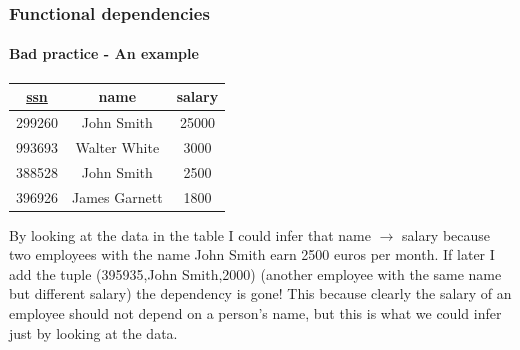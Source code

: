 \documentclass{beamer}
\newcommand{\fdep}[2]{#1 $\rightarrow$ #2}
\begin{document}
\begin{frame}
	\frametitle{Functional dependencies}
	\framesubtitle{Bad practice - An example}
	
	\begin{table}
		\begin{tabular}{|c|c|c|}
			\hline
			\underline{ssn} & name & salary\\
			\hline
			299260 & John Smith & 25000 \\
			\hline
			993693 & Walter White & 3000 \\
			\hline
			388528 & John Smith & 2500\\
			\hline
			396926 & James Garnett & 1800 \\
			\hline
		\end{tabular}
	\end{table}
	
	By looking at the data in the table I could infer that \fdep{name}{salary} because two employees with the name John Smith earn 2500 euros per month.
	If later I add the tuple (395935,John Smith,2000) (another employee with the same name but different salary) the dependency is gone!
	This because clearly the salary of an employee should not depend on a person’s name, but this is what we could infer just by looking at the data.
	
\end{frame}
\end{document}
